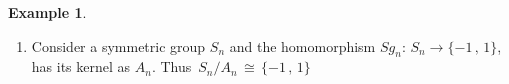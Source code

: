 \documentclass[11pt,a4paper]{article}
\theoremstyle{definition}
\newtheorem{exa}[thm]{Example}
\begin{document}
\begin{exa}
\begin{enumerate}
\begin{enumerate}
\item[$-$] $f$ is onto (epimorphism).\\
for each $y\in \mathbb{R}^x\, \exists\, $ a matrix $\, \begin{pmatrix}
y & *\\
0 & 1\\
\end{pmatrix}\, \ni\, f\begin{pmatrix}
\begin{pmatrix}
y & *\\
0 & 1\\
\end{pmatrix}
\end{pmatrix} = y\cdot 1 = y$.\\\\


\item[$-$] $f$ is one-to-one i.e $\, kern(f)  = \Big\{\begin{pmatrix}
a & b\\
0 & a^{-1}\\
\end{pmatrix}\Big|\, a\, , \, b\in \mathbb{R}\Big\} = k$\\

Clearly, $\,\, G\big/K\,\, \cong \, \, \mathbb{R}^x$
\begin{align*}
GK  & = f\begin{pmatrix}
\begin{pmatrix}
a & b\\
0 & c\\
\end{pmatrix} \begin{pmatrix}
x & y\\
0 & x^{-1}\\
\end{pmatrix}
\end{pmatrix} = f\begin{pmatrix}
ax & ay + bx^{-1}\\
0 & cx^{-1}\\
\end{pmatrix}\\\\
& = acxx^{-1}
 = ac\in \mathbb{R}^x\\
\end{align*}
\end{enumerate}



\item Consider a symmetric group $S_n$ and the homomorphism $Sg_n :\, S_n \longrightarrow \{-1\,, \, 1\}$, has its kernel as $A_n$. Thus $\,S_n\big/A_n \, \cong \, \{-1\, , \, 1\}$\\\\
\end{enumerate}
\end{exa}
\end{document}

